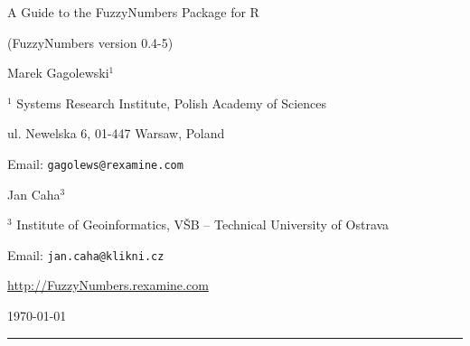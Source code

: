 \documentclass[11pt]{article}\usepackage[]{graphicx}\usepackage[]{color}
\newcommand{\package}[1]{\textsf{#1}\xspace}
\newcommand{\lang}[1]{\textsf{#1}\xspace}
\newcommand{\R}{\lang{R}}
\begin{document}



\begin{center}
{\LARGE\sf A Guide to the \package{FuzzyNumbers} Package for \R}

{\Large\sf (FuzzyNumbers version {0.4-5}) }

\bigskip
{\large Marek Gagolewski${}^{1}$}

${}^{1}$ Systems Research Institute, Polish Academy of Sciences

ul. Newelska 6, 01-447 Warsaw, Poland

Email: \texttt{gagolews@rexamine.com}

{\large Jan Caha${}^{3}$}

${}^{3}$ Institute of Geoinformatics, VŠB -- Technical University of Ostrava

Email: \texttt{jan.caha@klikni.cz}

\bigskip

\href{http://FuzzyNumbers.rexamine.com/}%
{http://FuzzyNumbers.rexamine.com}

\bigskip
\today



\end{center}





\bigskip\hrule\bigskip
\tableofcontents




\end{document}
